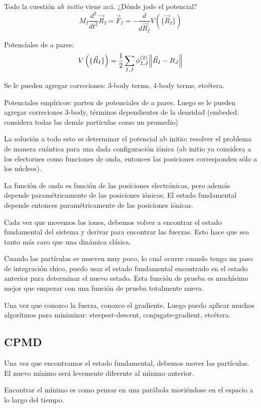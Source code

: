   Todo la cuestión \emph{ab initio} viene acá. ¿Dónde jode el potencial?
    $$M_I \frac{d^2}{dt^2} \vec{R}_I = \vec{F}_I = - \frac{d}{d\vec{R}_I} V \left( \{ \vec{R}_I \}  \right)$$

  Potenciales de a pares:
    $$V \left( \{ \vec{R}_I \}  \right) = \frac{1}{2} \sum_{I,J} \phi_{I,J}^{(2)} \norm{\vec{R}_I - R_J}$$

  Se le pueden agregar correciones: 3-body terms, 4-body terms, etcétera.

  Potenciales empíricos: parten de potenciales de a pares. Luego se le pueden agregar correciones 3-body, términos dependientes de la densidad (embeded: considera todas las demás partículas como un promedio)

  La solución a todo esto es determinar el potencial ab initio: resolver el problema de manera cuántica para una dada configuración iónica (ab initio ya considera a los electornes como funciones de onda, entonces las posiciones corresponden sólo a los núcleos).

  La función de onda es función de las posiciones electrónicas, pero además depende paramétricamente de las posiciones iónicas. El estado fundamental depende entonces paramétricamente de las posiciones iónicas.

  Cada vez que movemos los iones, debemos volver a encontrar el estado fundamental del sistema y derivar para encontrar las fuerzas. Esto hace que sea tanto más caro que una dinámica clásica.

  Cuando las partículas se mueven muy poco, lo cual ocurre cuando tengo un paso de integración chico, puedo usar el estado fundamental encontrado en el estado anterior para determinar el nuevo estado. Esta función de prueba es muchísimo mejor que empezar con una función de prueba totalmente nueva.

  Una vez que conozco la fuerza, conozco el gradiente. Luego puedo aplicar muchos algoritmos para minimizar: steepest-descent, conjugate-gradient, etcétera.

\subsection{CPMD}

  Una vez que encontramos el estado fundamental, debemos mover las partículas. El nuevo mínimo será levemente diferente al mínimo anterior.

  Encontrar el mínimo es como pensar en una parábola moviéndose en el espacio a lo largo del tiempo.

